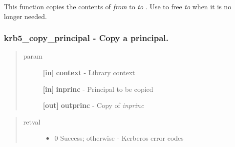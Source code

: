 \documentclass[letterpaper,10pt,english]{sphinxmanual}
\begin{document}
This function copies the contents of \emph{from} to \emph{to} . Use {\hyperref[appdev/refs/api/krb5_free_keyblock_contents:c.krb5_free_keyblock_contents]{}} to free \emph{to} when it is no longer needed.


\subsubsection{krb5\_copy\_principal -  Copy a principal.}
\label{appdev/refs/api/krb5_copy_principal:krb5-copy-principal-copy-a-principal}\label{appdev/refs/api/krb5_copy_principal::doc}

\begin{fulllineitems}
\label{appdev/refs/api/krb5_copy_principal:c.krb5_copy_principal}
\end{fulllineitems}

\begin{quote}\begin{description}
\item[{param}] \leavevmode
\textbf{{[}in{]}} \textbf{context} - Library context

\textbf{{[}in{]}} \textbf{inprinc} - Principal to be copied

\textbf{{[}out{]}} \textbf{outprinc} - Copy of \emph{inprinc}

\end{description}\end{quote}
\begin{quote}\begin{description}
\item[{retval}] \leavevmode\begin{itemize}
\item {} 
0   Success; otherwise - Kerberos error codes

\end{itemize}

\end{description}\end{quote}
\end{document}
